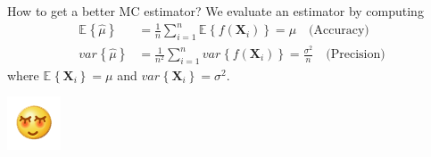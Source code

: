 \documentclass{beamer}
\newcommand{\matr}[1]{\mathbf{#1}}
\newcommand{\E}[2][]{\mathbb{E}_{#1}\left\{#2\right\}}
\newcommand{\var}[2][]{var_{#1}\left\{#2\right\}}
\newcommand{\bX}{\matr{X}}
\begin{document}


\begin{frame}{How to get a better MC estimator?}
We evaluate an estimator by computing
\begin{align*}
    \E{\hat{\mu}} &= \frac{1}{n} \sum_{i=1}^n \E{f(\bX_i)} = \mu \quad \text{(Accuracy)} \\ 
     \var{\hat{\mu}} &= \frac{1}{n^2}\sum_{i=1}^n \var{f(\bX_i)} = \frac{\sigma^2}{n} \quad \text{(Precision)}
\end{align*}
where $\E{\bX_i} = \mu$ and $\var{\bX_i}=\sigma^2$. 
\begin{center}
    \includegraphics{shy.png}
\end{center}
\end{frame}


\end{document}
